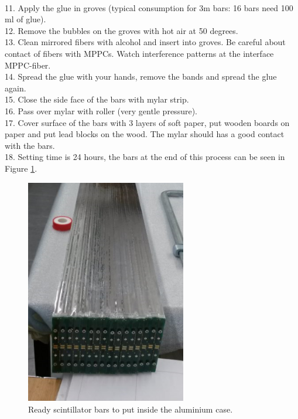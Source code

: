 \documentclass[a4paper]{article}\linespread{1.4}
\begin{document}
\\11.	Apply the glue in groves (typical consumption for 3m bars: 16 bars need 100 ml of glue).
\\12.	Remove the bubbles on the groves with hot air at 50 degrees.
\\13.	Clean mirrored fibers with alcohol and insert into groves. Be careful about contact of fibers with MPPCs. Watch interference patterns at the interface MPPC-fiber.
\\14.	Spread the glue with your hands, remove the bands and spread the glue again.
\\15.	 Close the side face of the bars with mylar strip.
\\16.	 Pass over mylar with roller (very gentle pressure).
\\17.	Cover surface of the bars with 3 layers of soft paper, put wooden boards on paper and put lead blocks on the wood. The mylar should has a good contact with the bars.
\\18.	Setting time is 24 hours, the bars at the end of this process can be seen in Figure \ref{fig:ready}.
\begin{figure}[h!] \centering \includegraphics[width=70mm,scale=2.0]{readypaint.png} \caption{Ready scintillator bars to put inside the aluminium case.}  \label{fig:ready}\end{figure}
\end{document}

